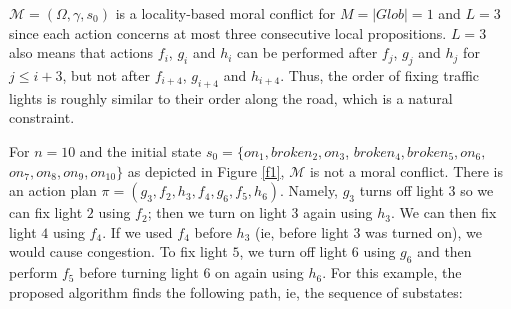 \documentclass[a4paper,fleqn]{cas-dc}
\begin{document}
$\mathcal{M}=(\Omega,\gamma,s_0)$ is a locality-based moral conflict for $M=|Glob|=1$ and $L=3$ since
each action concerns at most three consecutive local propositions. 
$L=3$ also means that actions $f_i$, $g_i$ and $h_i$ can be performed after $f_{j}$, $g_{j}$ and $h_{j}$ for
$j\le i+3$, but not after $f_{i+4}$, $g_{i+4}$ and $h_{i+4}$. Thus, the order of fixing traffic lights is roughly similar to their order along the road, which is a natural constraint.

For $n=10$ and the initial state $s_0=\{on_1, broken_2, on_3$, $broken_4, broken_5, on_6,$ $on_7, on_8, on_9, on_{10}\}$ as depicted
in Figure \ref{f1}, $\mathcal{M}$ is not a moral conflict.
There is an action plan $\pi=(g_3, f_2, h_3, f_4, g_6, f_5, h_6)$.
Namely, $g_3$ turns off light $3$ so we can fix light $2$ using $f_2$;
then we turn on light $3$ again using $h_3$. We can then fix light $4$ using $f_4$.
If we used $f_4$ before $h_3$ (ie, before light 3 was turned on), we would cause congestion. 
To fix light $5$, we turn off light $6$ using $g_6$ and then perform $f_5$ before turning light $6$ on again using $h_6$. For this example, the proposed algorithm finds the following path, ie, the sequence of substates:
\end{document}
